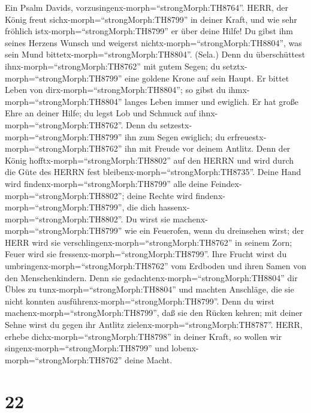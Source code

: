  Ein Psalm Davids,
vorzusingenx-morph=``strongMorph:TH8764''. HERR, der König freut
sichx-morph=``strongMorph:TH8799'' in deiner Kraft, und wie sehr
fröhlich istx-morph=``strongMorph:TH8799'' er über deine Hilfe!
 Du gibst ihm seines Herzens Wunsch und weigerst
nichtx-morph=``strongMorph:TH8804'', was sein Mund
bittetx-morph=``strongMorph:TH8804''. (Sela.)  Denn du
überschüttest ihnx-morph=``strongMorph:TH8762'' mit gutem Segen; du
setztx-morph=``strongMorph:TH8799'' eine goldene Krone auf sein Haupt.
 Er bittet Leben von dirx-morph=``strongMorph:TH8804''; so
gibst du ihmx-morph=``strongMorph:TH8804'' langes Leben immer und
ewiglich.  Er hat große Ehre an deiner Hilfe; du legst Lob
und Schmuck auf ihnx-morph=``strongMorph:TH8762''.  Denn du
setzestx-morph=``strongMorph:TH8799'' ihn zum Segen ewiglich; du
erfreuestx-morph=``strongMorph:TH8762'' ihn mit Freude vor deinem
Antlitz.  Denn der König hofftx-morph=``strongMorph:TH8802''
auf den HERRN und wird durch die Güte des HERRN fest
bleibenx-morph=``strongMorph:TH8735''.  Deine Hand wird
findenx-morph=``strongMorph:TH8799'' alle deine
Feindex-morph=``strongMorph:TH8802''; deine Rechte wird
findenx-morph=``strongMorph:TH8799'', die dich
hassenx-morph=``strongMorph:TH8802''.  Du wirst sie
machenx-morph=``strongMorph:TH8799'' wie ein Feuerofen, wenn du
dreinsehen wirst; der HERR wird sie
verschlingenx-morph=``strongMorph:TH8762'' in seinem Zorn; Feuer wird
sie fressenx-morph=``strongMorph:TH8799''.  Ihre Frucht
wirst du umbringenx-morph=``strongMorph:TH8762'' vom Erdboden und ihren
Samen von den Menschenkindern.  Denn sie
gedachtenx-morph=``strongMorph:TH8804'' dir Übles zu
tunx-morph=``strongMorph:TH8804'' und machten Anschläge, die sie nicht
konnten ausführenx-morph=``strongMorph:TH8799''.  Denn du
wirst machenx-morph=``strongMorph:TH8799'', daß sie den Rücken kehren;
mit deiner Sehne wirst du gegen ihr Antlitz
zielenx-morph=``strongMorph:TH8787''.  HERR, erhebe
dichx-morph=``strongMorph:TH8798'' in deiner Kraft, so wollen wir
singenx-morph=``strongMorph:TH8799'' und
lobenx-morph=``strongMorph:TH8762'' deine Macht.

\hypertarget{section-21}{%
\section{22}\label{section-21}}

